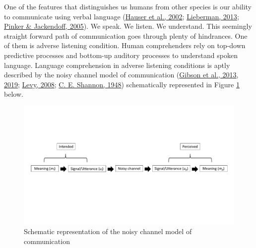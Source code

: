 \documentclass[a4paper, nobind]{templates/ociamthesis}
\begin{document}
One of the features that distinguishes us humans from other species is our ability to communicate using verbal language (\protect\hyperlink{ref-Hauser2002}{Hauser et al., 2002}; \protect\hyperlink{ref-Lieberman2013}{Lieberman, 2013}; \protect\hyperlink{ref-Pinker2005a}{Pinker \& Jackendoff, 2005}).
We speak. We listen. We understand.
This seemingly straight forward path of communication goes through plenty of hindrances.
One of them is adverse listening condition.
Human comprehenders rely on top-down predictive processes and bottom-up auditory processes to understand spoken language.
Language comprehension in adverse listening conditions is aptly described by the noisy channel model of communication (\protect\hyperlink{ref-Gibson2013}{Gibson et al., 2013}, \protect\hyperlink{ref-Gibson2019}{2019}; \protect\hyperlink{ref-Levy2008}{Levy, 2008}; \protect\hyperlink{ref-Shannon1948}{C. E. Shannon, 1948})
schematically represented in Figure \ref{fig:noisy-channel} below.

\begin{figure}[!htpb]

{\centering \includegraphics[width=0.9\linewidth]{figures/materials/noisy-channel} 

}

\caption{Schematic representation of the noisy channel model of communication}\label{fig:noisy-channel}
\end{figure}
\end{document}
